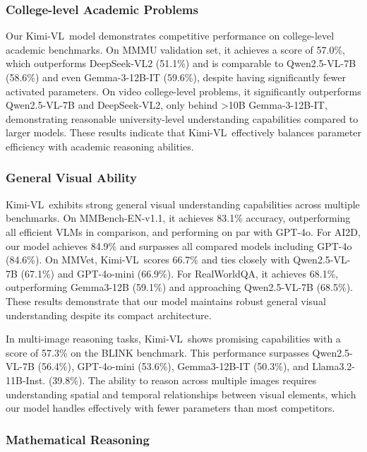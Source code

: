 \documentclass{article}
\newcommand{\ourname}{{Kimi-VL}}
\begin{document}
\subsubsection{College-level Academic Problems}

Our \ourname~model demonstrates competitive performance on college-level academic benchmarks. On MMMU validation set, it achieves a score of 57.0\%, which outperforms DeepSeek-VL2 (51.1\%) and is comparable to Qwen2.5-VL-7B (58.6\%) and even Gemma-3-12B-IT (59.6\%), despite having significantly fewer activated parameters. On video college-level problems, it significantly outperforms Qwen2.5-VL-7B and DeepSeek-VL2, only behind >10B Gemma-3-12B-IT, demonstrating reasonable university-level understanding capabilities compared to larger models. These results indicate that \ourname~effectively balances parameter efficiency with academic reasoning abilities.



\subsubsection{General Visual Ability}

\ourname~exhibits strong general visual understanding capabilities across multiple benchmarks. On MMBench-EN-v1.1, it achieves 83.1\% accuracy, outperforming all efficient VLMs in comparison, and performing on par with GPT-4o. For AI2D, our model achieves 84.9\% and surpasses all compared models including GPT-4o (84.6\%). On MMVet, \ourname~scores 66.7\% and ties closely with Qwen2.5-VL-7B (67.1\%) and GPT-4o-mini (66.9\%). For RealWorldQA, it achieves 68.1\%, outperforming Gemma3-12B (59.1\%) and approaching Qwen2.5-VL-7B (68.5\%). These results demonstrate that our model maintains robust general visual understanding despite its compact architecture.

In multi-image reasoning tasks, \ourname~shows promising capabilities with a score of 57.3\% on the BLINK benchmark. This performance surpasses Qwen2.5-VL-7B (56.4\%), GPT-4o-mini (53.6\%), Gemma3-12B-IT (50.3\%), and Llama3.2-11B-Inst. (39.8\%). The ability to reason across multiple images requires understanding spatial and temporal relationships between visual elements, which our model handles effectively with fewer parameters than most competitors. 

\subsubsection{Mathematical Reasoning}
\end{document}
